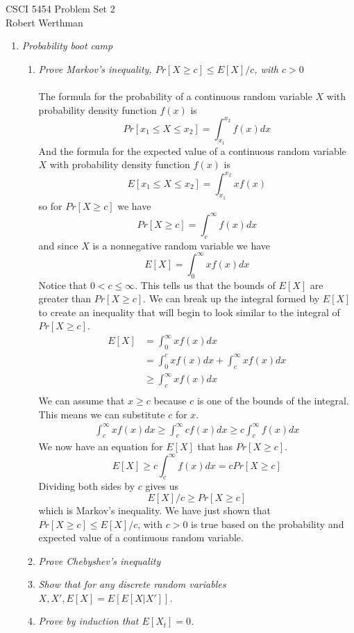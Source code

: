 \documentclass[12pt]{article}
\begin{document}
CSCI 5454 \hfill Problem Set 2\\
Robert Werthman

\hrulefill

\begin{enumerate}

	\item \textit{Probability boot camp}
	
	\begin{enumerate}
	
		\item \textit{Prove Markov's inequality, $Pr[X \ge c] \le E[X]/c$, with $c>0$}\\
		\\
		The formula for the probability of a continuous random variable $X$ with probability density function $f(x)$ is
			$$
			Pr[x_1 \le X \le x_2] = \int_{x_1}^{x_2} f(x)dx
			$$	
		And the formula for the expected value of a continuous random variable $X$ with probability density function $f(x)$ is
			$$
			E[x_1 \le X \le x_2] = \int_{x_1}^{x_2} xf(x)
			$$	
		so for $Pr[X \ge c]$ we have
			$$
			Pr[X \ge c] = \int_{c}^{\infty} f(x)dx
			$$
		and since $X$ is a nonnegative random variable we have
			$$
			E[X] = \int_{0}^{\infty} xf(x)dx
			$$
		Notice that $0 < c \le \infty$.  This tells us that the bounds of $E[X]$ are greater than $Pr[X \ge c]$.  We can break up the integral formed by $E[X]$ to create an inequality that 
		will begin to look similar to the integral of $Pr[X \ge c]$.
			\begin{align*}
				E[X] &= \int_{0}^{\infty} xf(x)dx\\
				&= \int_{0}^{c} xf(x)dx + \int_{c}^{\infty} xf(x)dx\\
				&\ge \int_{c}^{\infty} xf(x)dx\\
			\end{align*}
		We can assume that $x \ge c$ because $c$ is one of the bounds of the integral.  This means we can substitute $c$ for $x$.
			\begin{align*}
				 \int_{c}^{\infty} xf(x)dx \ge \int_{c}^{\infty} cf(x)dx \ge c\int_{c}^{\infty} f(x)dx
			\end{align*}
		We now have an equation for $E[X]$ that has $Pr[X \ge c]$.
			$$
			E[X] \ge c\int_{c}^{\infty} f(x)dx = cPr[X \ge c]
			$$
		Dividing both sides by $c$ gives us
			$$
			E[X]/c \ge Pr[X \ge c]
			$$
		which is Markov's inequality.  We have just shown that $Pr[X \ge c] \le E[X]/c$, with $c>0$ is true based on the probability and expected value of a continuous random variable.
		
		\item \textit{Prove Chebyshev's inequality}
		
		\item \textit{Show that for any discrete random variables $X,X',E[X] = E[E[X|X']]$.}
		
		\item \textit{Prove by induction that $E[X_t] = 0$.}
	
	\end{enumerate}


\end{enumerate}
\end{document}
